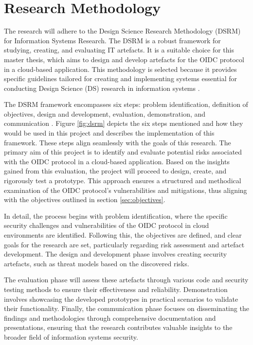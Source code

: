\section{Research Methodology}
The research will adhere to the Design Science Research Methodology (DSRM) for Information Systems Research. The DSRM is a robust framework for studying, creating, and evaluating IT artefacts. It is a suitable choice for this master thesis, which aims to design and develop artefacts for the OIDC protocol in a cloud-based application. This methodology is selected because it provides specific guidelines tailored for creating and implementing systems essential for conducting Design Science (DS) research in information systems \citep{dsrm}.

The DSRM framework encompasses six steps: problem identification, definition of objectives, design and development, evaluation, demonstration, and communication \citep{dsrm}. Figure \ref{fig:dsrm} depicts the six steps mentioned and how they would be used in this project and describes the implementation of this framework. These steps align seamlessly with the goals of this research. The primary aim of this project is to identify and evaluate potential risks associated with the OIDC protocol in a cloud-based application. Based on the insights gained from this evaluation, the project will proceed to design, create, and rigorously test a prototype. This approach ensures a structured and methodical examination of the OIDC protocol’s vulnerabilities and mitigations, thus aligning with the objectives outlined in section \ref{sec:objectives}.

In detail, the process begins with problem identification, where the specific security challenges and vulnerabilities of the OIDC protocol in cloud environments are identified. Following this, the objectives are defined, and clear goals for the research are set, particularly regarding risk assessment and artefact development. The design and development phase involves creating security artefacts, such as threat models based on the discovered risks.

The evaluation phase will assess these artefacts through various code and security testing methods to ensure their effectiveness and reliability. Demonstration involves showcasing the developed prototypes in practical scenarios to validate their functionality. Finally, the communication phase focuses on disseminating the findings and methodologies through comprehensive documentation and presentations, ensuring that the research contributes valuable insights to the broader field of information systems security.

